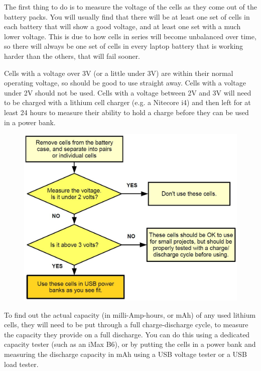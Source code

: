 \documentclass{article}
\theoremstyle{definition}
\theoremstyle{definition}
\theoremstyle{remark}
\begin{document}
    The first thing to do is to measure the voltage of the cells as they come out of the battery packs. You will usually find that there will be at least one set of cells in each battery that will show a good voltage, and at least one set with a much lower voltage. This is due to how cells in series will become unbalanced over time, so there will always be one set of cells in every laptop battery that is working harder than the others, that will fail sooner.

    Cells with a voltage over 3V (or a little under 3V) are within their normal operating voltage, so should be good to use straight away. Cells with a voltage under 2V should not be used. Cells with a voltage between 2V and 3V will need to be charged with a lithium cell charger (e.g. a Nitecore i4) and then left for at least 24 hours to measure their ability to hold a charge before they can be used in a power bank.

    \begin{figure}[!ht]
      \centering
      \includegraphics[width=0.75\paperwidth]{Images/image_5_5_(flowchart).png}
    \end{figure}

    To find out the actual capacity (in milli-Amp-hours, or mAh) of any used lithium cells, they will need to be put through a full charge-discharge cycle, to measure the capacity they provide on a full discharge. You can do this using a dedicated capacity tester (such as an iMax B6), or by putting the cells in a power bank and measuring the discharge capacity in mAh using a USB voltage tester or a USB load tester.
  
\end{document}
